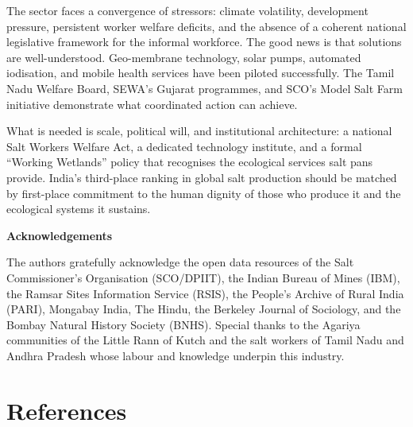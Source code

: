 \documentclass[12pt,a4paper]{article}
\begin{document}
The sector faces a convergence of stressors: climate volatility, development pressure,
persistent worker welfare deficits, and the absence of a coherent national legislative
framework for the informal workforce. The good news is that solutions are well-understood.
Geo-membrane technology, solar pumps, automated iodisation, and mobile health services
have been piloted successfully. The Tamil Nadu Welfare Board, SEWA's Gujarat programmes,
and SCO's Model Salt Farm initiative demonstrate what coordinated action can achieve.

What is needed is scale, political will, and institutional architecture: a national Salt
Workers Welfare Act, a dedicated technology institute, and a formal ``Working Wetlands''
policy that recognises the ecological services salt pans provide. India's third-place
ranking in global salt production should be matched by first-place commitment to the human
dignity of those who produce it and the ecological systems it sustains.

\medskip
\noindent\textbf{Acknowledgements}

The authors gratefully acknowledge the open data resources of the Salt Commissioner's
Organisation (SCO/DPIIT), the Indian Bureau of Mines (IBM), the Ramsar Sites Information
Service (RSIS), the People's Archive of Rural India (PARI), Mongabay India, The Hindu,
the Berkeley Journal of Sociology, and the Bombay Natural History Society (BNHS).
Special thanks to the Agariya communities of the Little Rann of Kutch and the salt
workers of Tamil Nadu and Andhra Pradesh whose labour and knowledge underpin this industry.

\clearpage
\section*{References}
\end{document}
